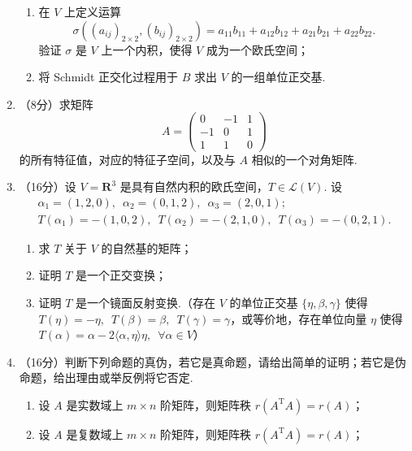 \begin{enumerate}
\begin{enumerate}
        \item 在 $V$ 上定义运算
        \[\sigma\left((a_{ij})_{2 \times 2},\left(b_{ij}\right)_{2 \times 2}\right)=a_{11} b_{11}+a_{12} b_{12}+a_{21} b_{21}+a_{22} b_{22}.\]
        验证 $\sigma$ 是 $V$ 上一个内积，使得 $V$ 成为一个欧氏空间；

        \item 将 Schmidt 正交化过程用于 $B$ 求出 $V$ 的一组单位正交基.
    \end{enumerate}

    \item （8分）求矩阵
    \[A=\begin{pmatrix}
    0 & -1 & 1 \\
    -1 & 0 & 1 \\
    1 & 1 & 0
    \end{pmatrix}\]
    的所有特征值，对应的特征子空间，以及与 $A$ 相似的一个对角矩阵.

    \item （16分）设 $V=\mathbf{R}^3$ 是具有自然内积的欧氏空间，$T \in \mathcal{L}(V)$. 设
    \begin{gather*}
        \alpha_1=(1,2,0), \enspace \alpha_2=(0,1,2), \enspace \alpha_3=(2,0,1); \\
        T(\alpha_1)=-(1,0,2), \enspace T(\alpha_2)=-(2,1,0), \enspace T(\alpha_3)=-(0,2,1).
    \end{gather*}
    \begin{enumerate}
        \item 求 $T$ 关于 $V$ 的自然基的矩阵；

        \item 证明 $T$ 是一个正交变换；

        \item 证明 $T$ 是一个镜面反射变换.（存在 $V$ 的单位正交基 $\{\eta,\beta,\gamma\}$ 使得 $T(\eta)=-\eta,\enspace\allowbreak T(\beta)=\beta,\enspace\allowbreak T(\gamma)=\gamma$，或等价地，存在单位向量 $\eta$ 使得 $T(\alpha)=\alpha-2\langle\alpha, \eta\rangle \eta,\enspace\allowbreak \forall \alpha \in V$）
    \end{enumerate}

    \item （16分）判断下列命题的真伪，若它是真命题，请给出简单的证明；若它是伪命题，给出理由或举反例将它否定.
    \begin{enumerate}
        \item 设 $A$ 是实数域上 $m \times n$ 阶矩阵，则矩阵秩 $r\left(A^{\mathrm{T}} A\right)=r(A)$；

        \item 设 $A$ 是复数域上 $m \times n$ 阶矩阵，则矩阵秩 $r\left(A^{\mathrm{T}} A\right)=r(A)$；


\end{enumerate}
\end{enumerate}
